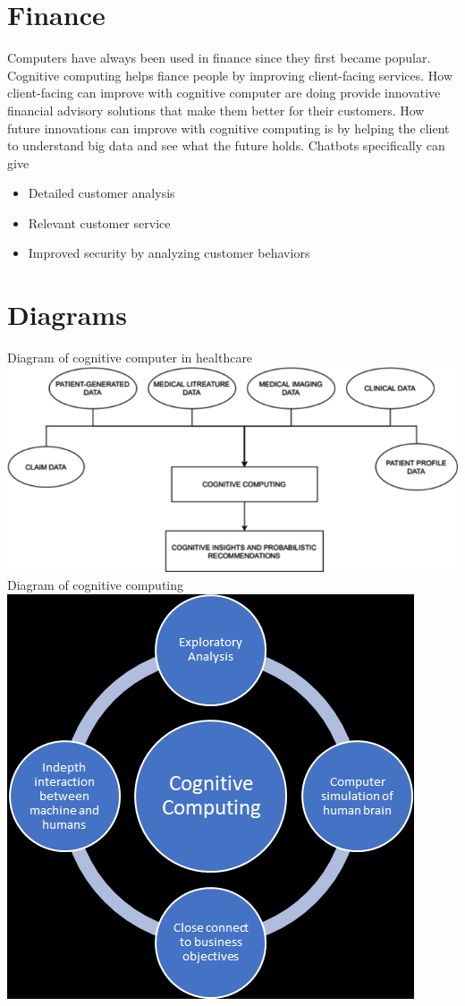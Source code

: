 \documentclass{article}
\begin{document}
\section{Finance}
Computers have always been used in finance since they first became popular. Cognitive computing helps fiance people by improving client-facing services. How client-facing can improve with cognitive computer are doing provide innovative financial advisory solutions that make them better for their customers. How future innovations can improve with cognitive computing is by helping the client to understand big data and see what the future holds.
Chatbots specifically can give
\begin{itemize}
    \item Detailed customer analysis
    \item Relevant customer service
    \item Improved security by analyzing customer behaviors
\end{itemize} \cite{pulse}

\section{Diagrams}
Diagram of cognitive computer in healthcare \\
\includegraphics[scale=0.5]{Healthcare} \\
Diagram of cognitive computing \\
\includegraphics[scale=0.5]{Cognitive} \\

\break

\end{document}
